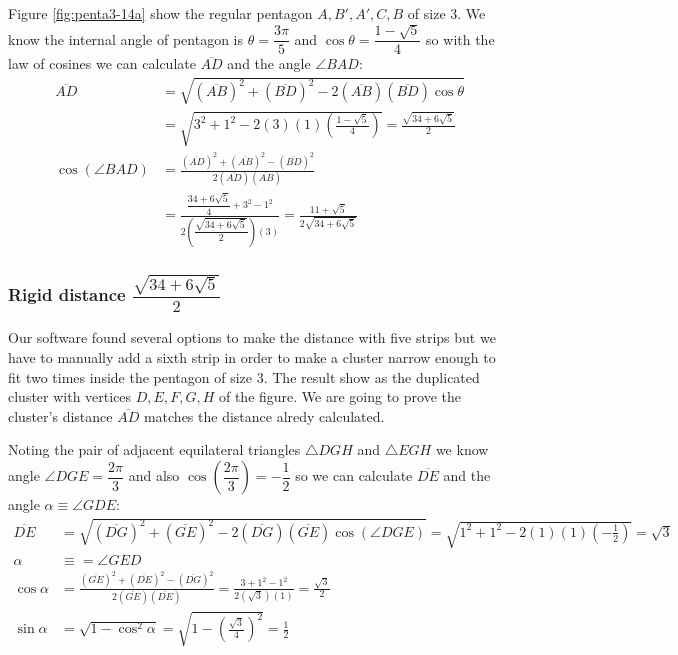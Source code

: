 \documentclass[11pt]{article}
\begin{document}
Figure \ref{fig:penta3-14a} show the regular pentagon $A,B',A',C,B$ of size $3$. We know the internal angle of pentagon is $\theta=\dfrac{3\pi}5$ and $\cos\theta=\dfrac{1-\sqrt5}4$ so with the law of cosines we can calculate $\overline{AD}$ and the angle $\angle{BAD}$:
\begin{align}
\overline{AD} &= \sqrt{(\overline{AB})^2 + (\overline{BD})^2
 - 2(\overline{AB})(\overline{BD})\cos\theta} \nonumber\\
 &= \sqrt{3^2 + 1^2 - 2(3)(1)\left(\frac{1-\sqrt5}4\right)} = \frac{\sqrt{34+6\sqrt5}}2\\
\cos(\angle{BAD}) &= \frac{(\overline{AD})^2 + (\overline{AB})^2 - (\overline{BD})^2}
 {2(\overline{AD})(\overline{AB})} \nonumber\\
 &= \frac{\dfrac{34+6\sqrt5}4 + 3^2 - 1^2}{2\left(\dfrac{\sqrt{34+6\sqrt5}}2\right)(3)}
  = \frac{11+\sqrt5}{2\sqrt{34+6\sqrt5}}
\end{align}

\subsubsection{Rigid distance  $\dfrac{\sqrt{34+6\sqrt5}}2$}

Our software found several options to make the distance with five strips but we have to manually add a sixth strip in order to make a cluster narrow enough to fit two times inside the pentagon of size $3$. The result show as the duplicated cluster with vertices $D,E,F,G,H$ of the figure. We are going to prove the cluster's distance $\overline{AD}$ matches the distance alredy calculated.

Noting the pair of adjacent equilateral triangles $\triangle{DGH}$ and $\triangle{EGH}$ we know angle $\angle{DGE} = \dfrac{2\pi}3$ and also $\cos\left(\dfrac{2\pi}3\right) = -\dfrac{1}2$ so we can calculate $\overline{DE}$ and the angle $\alpha \equiv \angle{GDE}$:
\begin{align}
\overline{DE} &= \sqrt{(\overline{DG})^2 + (\overline{GE})^2 
 - 2(\overline{DG})(\overline{GE})\cos(\angle{DGE})}
 = \sqrt{1^2 + 1^2 - 2(1)(1)\left(-\frac{1}2\right)} = \sqrt3\\
\alpha &\equiv = \angle{GED} \nonumber\\
\cos\alpha &= \frac{(\overline{GE})^2 + (\overline{DE})^2 - (\overline{DG})^2}
 {2(\overline{GE})(\overline{DE})}
 = \frac{3 + 1^2 - 1^2}{2(\sqrt3)(1)} = \frac{\sqrt3}2\\
\sin\alpha &= \sqrt{1 - \cos^2\alpha} = \sqrt{1 - \left(\frac{\sqrt3}4\right)^2} 
 = \frac{1}2
\end{align}
\end{document}

